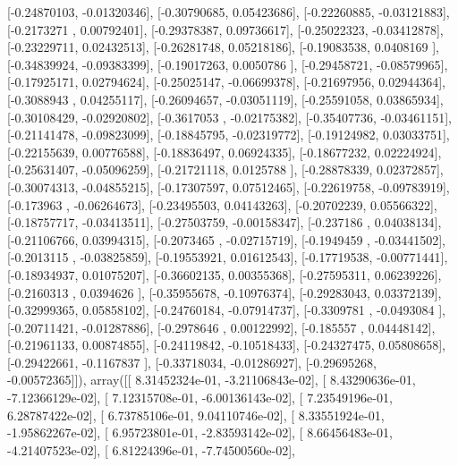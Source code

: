 \documentclass{article}
\begin{document}
       [-0.24870103, -0.01320346],
       [-0.30790685,  0.05423686],
       [-0.22260885, -0.03121883],
       [-0.2173271 ,  0.00792401],
       [-0.29378387,  0.09736617],
       [-0.25022323, -0.03412878],
       [-0.23229711,  0.02432513],
       [-0.26281748,  0.05218186],
       [-0.19083538,  0.0408169 ],
       [-0.34839924, -0.09383399],
       [-0.19017263,  0.0050786 ],
       [-0.29458721, -0.08579965],
       [-0.17925171,  0.02794624],
       [-0.25025147, -0.06699378],
       [-0.21697956,  0.02944364],
       [-0.3088943 ,  0.04255117],
       [-0.26094657, -0.03051119],
       [-0.25591058,  0.03865934],
       [-0.30108429, -0.02920802],
       [-0.3617053 , -0.02175382],
       [-0.35407736, -0.03461151],
       [-0.21141478, -0.09823099],
       [-0.18845795, -0.02319772],
       [-0.19124982,  0.03033751],
       [-0.22155639,  0.00776588],
       [-0.18836497,  0.06924335],
       [-0.18677232,  0.02224924],
       [-0.25631407, -0.05096259],
       [-0.21721118,  0.0125788 ],
       [-0.28878339,  0.02372857],
       [-0.30074313, -0.04855215],
       [-0.17307597,  0.07512465],
       [-0.22619758, -0.09783919],
       [-0.173963  , -0.06264673],
       [-0.23495503,  0.04143263],
       [-0.20702239,  0.05566322],
       [-0.18757717, -0.03413511],
       [-0.27503759, -0.00158347],
       [-0.237186  ,  0.04038134],
       [-0.21106766,  0.03994315],
       [-0.2073465 , -0.02715719],
       [-0.1949459 , -0.03441502],
       [-0.2013115 , -0.03825859],
       [-0.19553921,  0.01612543],
       [-0.17719538, -0.00771441],
       [-0.18934937,  0.01075207],
       [-0.36602135,  0.00355368],
       [-0.27595311,  0.06239226],
       [-0.2160313 ,  0.0394626 ],
       [-0.35955678, -0.10976374],
       [-0.29283043,  0.03372139],
       [-0.32999365,  0.05858102],
       [-0.24760184, -0.07914737],
       [-0.3309781 , -0.0493084 ],
       [-0.20711421, -0.01287886],
       [-0.2978646 ,  0.00122992],
       [-0.185557  ,  0.04448142],
       [-0.21961133,  0.00874855],
       [-0.24119842, -0.10518433],
       [-0.24327475,  0.05808658],
       [-0.29422661, -0.1167837 ],
       [-0.33718034, -0.01286927],
       [-0.29695268, -0.00572365]]), array([[  8.31452324e-01,  -3.21106843e-02],
       [  8.43290636e-01,  -7.12366129e-02],
       [  7.12315708e-01,  -6.00136143e-02],
       [  7.23549196e-01,   6.28787422e-02],
       [  6.73785106e-01,   9.04110746e-02],
       [  8.33551924e-01,  -1.95862267e-02],
       [  6.95723801e-01,  -2.83593142e-02],
       [  8.66456483e-01,  -4.21407523e-02],
       [  6.81224396e-01,  -7.74500560e-02],
\end{document}
